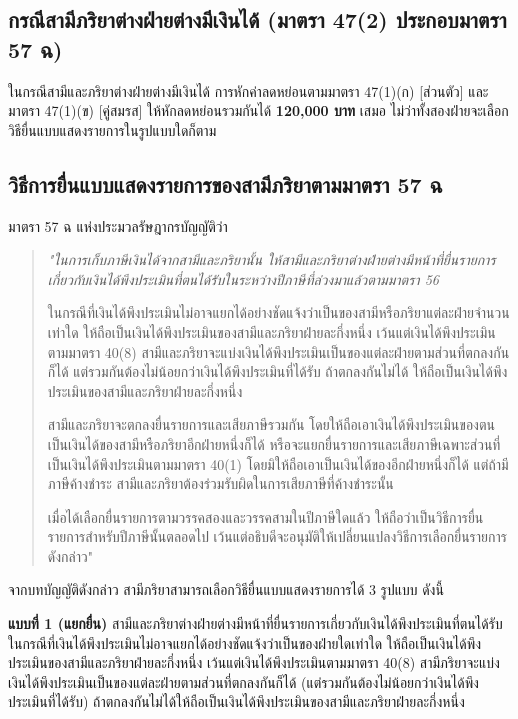 \documentclass[12pt,a4paper]{article}
\newcommand{\hilight}[1]{\textbf{#1}}
\begin{document}
\subsection*{กรณีสามีภริยาต่างฝ่ายต่างมีเงินได้ (มาตรา 47(2) ประกอบมาตรา 57 ฉ)}

ในกรณีสามีและภริยาต่างฝ่ายต่างมีเงินได้ การหักค่าลดหย่อนตามมาตรา 47(1)(ก) [ส่วนตัว] และมาตรา 47(1)(ข) [คู่สมรส] ให้หักลดหย่อนรวมกันได้ \hilight{120,000 บาท} เสมอ ไม่ว่าทั้งสองฝ่ายจะเลือกวิธียื่นแบบแสดงรายการในรูปแบบใดก็ตาม

\subsection*{วิธีการยื่นแบบแสดงรายการของสามีภริยาตามมาตรา 57 ฉ}

มาตรา 57 ฉ แห่งประมวลรัษฎากรบัญญัติว่า

\begin{quote}
{\itshape "ในการเก็บภาษีเงินได้จากสามีและภริยานั้น ให้สามีและภริยาต่างฝ่ายต่างมีหน้าที่ยื่นรายการเกี่ยวกับเงินได้พึงประเมินที่ตนได้รับในระหว่างปีภาษีที่ล่วงมาแล้วตามมาตรา 56

ในกรณีที่เงินได้พึงประเมินไม่อาจแยกได้อย่างชัดแจ้งว่าเป็นของสามีหรือภริยาแต่ละฝ่ายจำนวนเท่าใด ให้ถือเป็นเงินได้พึงประเมินของสามีและภริยาฝ่ายละกึ่งหนึ่ง เว้นแต่เงินได้พึงประเมินตามมาตรา 40(8) สามีและภริยาจะแบ่งเงินได้พึงประเมินเป็นของแต่ละฝ่ายตามส่วนที่ตกลงกันก็ได้ แต่รวมกันต้องไม่น้อยกว่าเงินได้พึงประเมินที่ได้รับ ถ้าตกลงกันไม่ได้ ให้ถือเป็นเงินได้พึงประเมินของสามีและภริยาฝ่ายละกึ่งหนึ่ง

สามีและภริยาจะตกลงยื่นรายการและเสียภาษีรวมกัน โดยให้ถือเอาเงินได้พึงประเมินของตนเป็นเงินได้ของสามีหรือภริยาอีกฝ่ายหนึ่งก็ได้ หรือจะแยกยื่นรายการและเสียภาษีเฉพาะส่วนที่เป็นเงินได้พึงประเมินตามมาตรา 40(1) โดยมิให้ถือเอาเป็นเงินได้ของอีกฝ่ายหนึ่งก็ได้ แต่ถ้ามีภาษีค้างชำระ สามีและภริยาต้องร่วมรับผิดในการเสียภาษีที่ค้างชำระนั้น

เมื่อได้เลือกยื่นรายการตามวรรคสองและวรรคสามในปีภาษีใดแล้ว ให้ถือว่าเป็นวิธีการยื่นรายการสำหรับปีภาษีนั้นตลอดไป เว้นแต่อธิบดีจะอนุมัติให้เปลี่ยนแปลงวิธีการเลือกยื่นรายการดังกล่าว"}
\end{quote}

จากบทบัญญัติดังกล่าว สามีภริยาสามารถเลือกวิธียื่นแบบแสดงรายการได้ 3 รูปแบบ ดังนี้

\textbf{แบบที่ 1 (แยกยื่น)} สามีและภริยาต่างฝ่ายต่างมีหน้าที่ยื่นรายการเกี่ยวกับเงินได้พึงประเมินที่ตนได้รับ ในกรณีที่เงินได้พึงประเมินไม่อาจแยกได้อย่างชัดแจ้งว่าเป็นของฝ่ายใดเท่าใด ให้ถือเป็นเงินได้พึงประเมินของสามีและภริยาฝ่ายละกึ่งหนึ่ง เว้นแต่เงินได้พึงประเมินตามมาตรา 40(8) สามีภริยาจะแบ่งเงินได้พึงประเมินเป็นของแต่ละฝ่ายตามส่วนที่ตกลงกันก็ได้ (แต่รวมกันต้องไม่น้อยกว่าเงินได้พึงประเมินที่ได้รับ) ถ้าตกลงกันไม่ได้ให้ถือเป็นเงินได้พึงประเมินของสามีและภริยาฝ่ายละกึ่งหนึ่ง
\end{document}
